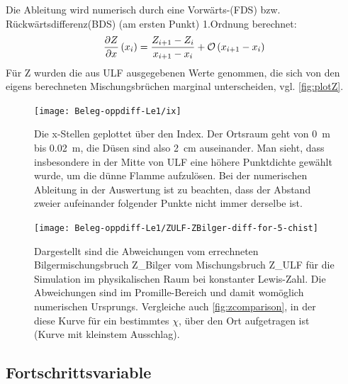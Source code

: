 Die Ableitung wird numerisch durch eine Vorwärts-(\gls{FDS}) bzw. Rückwärtsdifferenz(\gls{BDS}) (am ersten Punkt) 1.Ordnung berechnet:
\begin{align}
    \frac{\partial Z}{\partial x}\left( x_i \right) = \frac{Z_{i+1}-Z_i}{x_{i+1}-x_i} + \mathcal{O}\left( x_{i+1}-x_i \right)
\end{align}
Für \gls{Z} wurden die aus ULF ausgegebenen Werte genommen, die sich von den eigens berechneten Mischungsbrüchen marginal unterscheiden, vgl. \autoref{fig:plotZ}.
\begin{figure}[H]
    \begin{center}\begin{minipage}{0.6\linewidth}
        \texttt{[image: Beleg-oppdiff-Le1/ix]}
    \end{minipage}\end{center}
    \caption{Die \gls{x}-Stellen geplottet über den Index. Der Ortsraum geht von \SI{0}{\meter} bis \SI{0.02}{\meter}, die Düsen sind also \SI{2}{\centi\meter} auseinander. Man sieht, dass insbesondere in der Mitte von \gls{ULF} eine höhere Punktdichte gewählt wurde, um die dünne Flamme aufzulösen. Bei der numerischen Ableitung in der Auswertung ist zu beachten, dass der Abstand zweier aufeinander folgender Punkte nicht immer derselbe ist.}
    \label{fig:plotx}
\end{figure}

\begin{figure}[H]
    \begin{center}\begin{minipage}{0.6\linewidth}
        \texttt{[image: Beleg-oppdiff-Le1/ZULF-ZBilger-diff-for-5-chist]}
    \end{minipage}\end{center}
    \caption{Dargestellt sind die Abweichungen vom errechneten Bilgermischungsbruch \gls{Z_Bilger} vom Mischungsbruch \gls{Z_ULF} für die Simulation im physikalischen Raum bei konstanter Lewis-Zahl. Die Abweichungen sind im Promille-Bereich und damit womöglich numerischen Ursprungs. Vergleiche auch \autoref{fig:zcomparison}, in der diese Kurve für ein bestimmtes $\chi$, über den Ort aufgetragen ist (Kurve mit kleinstem Ausschlag).}
    \label{fig:plotZ}
\end{figure}


\subsection{Fortschrittsvariable}
\label{sct:PV}

